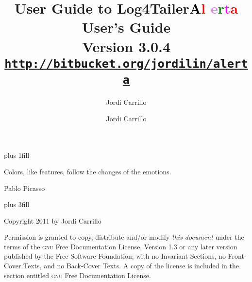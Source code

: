 \documentclass[a4paper, twoside]{article}
\author{Jordi Carrillo}
\title{User Guide to Log4Tailer}
\newcommand{\logftailer}{\textbf{\textcolor{black}{A}\textcolor{red}{l}%
\textcolor{Violet}{e}\textcolor{green}{r}\textcolor{magenta}{t}\textcolor{red}{a}}}
\newcommand{\contentsrule}[1]{{\color{blue}\sectionrule{3ex}{3pt}{-2ex}{1pt}{#1}}}
\begin{document}


\newpage
\pagecolor{white}

\vbox{}
\vskip0pt plus 1fill
\epigraph{Colors, like features, follow the changes of the emotions.}{Pablo Picasso}
 \vskip0pt plus 3fill

\noindent
Copyright 2011 by Jordi Carrillo

\medskip
\noindent 
Permission is granted to copy, distribute and/or modify \emph{this document}
under the terms of the \textsc{gnu} Free Documentation License, Version 1.3
or any later version published by the Free Software Foundation;
with no Invariant Sections, no Front-Cover Texts, and no Back-Cover Texts.
A copy of the license is included in the section entitled \textsc{gnu}
Free Documentation License.


\vbox{}
\newpage


\title{{\bfseries \logftailer{} User's Guide}\\[1mm]
  \large Version 3.0.4\\[1mm]
\large\href{http://bitbucket.org/jordilin/alerta}{\texttt{http://bitbucket.org/jordilin/alerta}}}
\author{Jordi Carrillo}

\maketitle

\tableofcontents

\newpage




%

\end{document}
